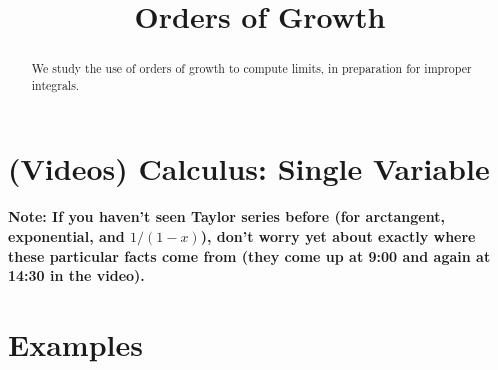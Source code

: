 \documentclass{ximera}
\title{Orders of Growth}
\begin{document}
\begin{abstract}
We study the use of orders of growth to compute limits, in preparation for improper integrals.
\end{abstract}
\maketitle

\section*{(Videos) Calculus: Single Variable}
\textbf{Note: If you haven't seen Taylor series before (for arctangent, exponential, and $1/(1-x)$), don't worry yet about exactly where these particular facts come from (they come up at 9:00 and again at 14:30 in the video).}

\section*{Examples}
\begin{example}

\end{example}

\begin{example}

\end{example}
\end{document}
